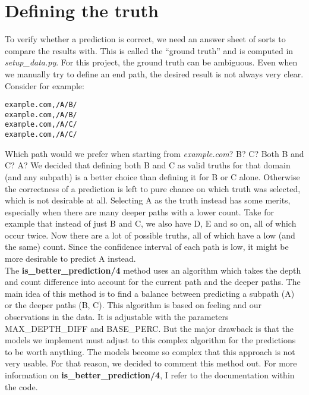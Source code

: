 \section{Defining the truth}\label{sec:truth}

To verify whether a prediction is correct, we need an answer sheet of sorts to compare the results with. This is called the ``ground truth'' and is computed in \textit{setup\_data.py}. For this project, the ground truth can be ambiguous. Even when we manually try to define an end path, the desired result is not always very clear. Consider for example:
\begin{verbatim}
example.com,/A/B/
example.com,/A/B/
example.com,/A/C/
example.com,/A/C/
\end{verbatim}
Which path would we prefer when starting from \textit{example.com}? B? C? Both B and C? A? We decided that defining both B and C as valid truths for that domain (and any subpath) is a better choice than defining it for B or C alone. Otherwise the correctness of a prediction is left to pure chance on which truth was selected, which is not desirable at all. Selecting A as the truth instead has some merits, especially when there are many deeper paths with a lower count. Take for example that instead of just B and C, we also have D, E and so on, all of which occur twice. Now there are a lot of possible truths, all of which have a low (and the same) count. Since the confidence interval of each path is low, it might be more desirable to predict A instead. 
\\[2ex]
The \textbf{is\_better\_prediction/4} method uses an algorithm which takes the depth and count difference into account for the current path and the deeper paths. The main idea of this method is to find a balance between predicting a subpath (A) or the deeper paths (B, C). This algorithm is based on feeling and our observations in the data. It is adjustable with the parameters MAX\_DEPTH\_DIFF and BASE\_PERC. But the major drawback is that the models we implement must adjust to this complex algorithm for the predictions to be worth anything. The models become so complex that this approach is not very usable. For that reason, we decided to comment this method out. For more information on \textbf{is\_better\_prediction/4}, I refer to the documentation within the code.
\\[2ex]
